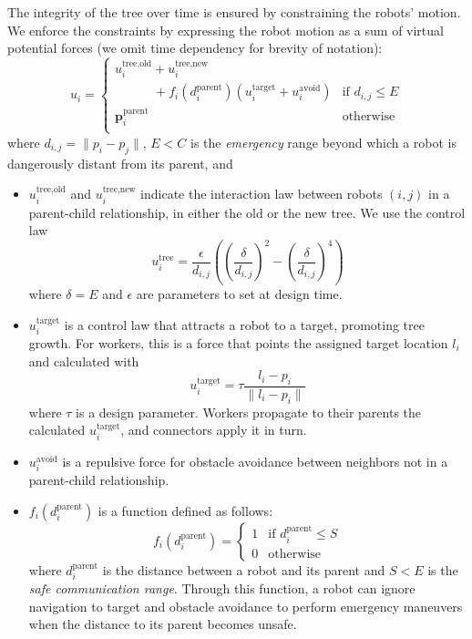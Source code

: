The integrity of the tree over time is ensured by constraining the
robots' motion. We enforce the constraints by expressing the robot
motion as a sum of virtual potential forces (we omit time dependency
for brevity of notation):
$$
u_i =
\begin{cases}
  u_i^{\text{tree,old}} + u_i^{\text{tree,new}} \\ \quad\quad\quad + f_i(d_i^{\text{parent}}) (u_i^{\text{target}} + u_i^{\text{avoid}}) & \text{if }d_{i,j} \le E\\
  \mathbf{p}_i^{\text{parent}} & \text{otherwise} \\
\end{cases}
$$
where $d_{i,j} = \parallel p_i - p_j \parallel$, $E < C$ is the
\emph{emergency} range beyond which a robot is dangerously distant
from its parent, and
\begin{itemize}
\item $u_i^{\text{tree,old}}$ and $u_i^{\text{tree,new}}$ indicate the
  interaction law between robots $(i,j)$ in a parent-child
  relationship, in either the old or the new tree. We use the control
  law
  $$
  u_i^{\text{tree}} =
  \frac{\epsilon}{d_{i,j}}
  \left(
    \left(
      \frac{\delta}{d_{i,j}}
    \right)^2
    -
    \left(
      \frac{\delta}{d_{i,j}}
    \right)^4
  \right)
  $$
  where $\delta = E$ and
  $\epsilon$ are parameters to set at design time.
\item $u_i^{\text{target}}$ is a control law that attracts a robot to a
  target, promoting tree growth. For workers, this is a force that
  points the assigned target location $l_i$ and calculated with
  $$
  u_i^{\text{target}} = \tau \frac{l_i - p_i}{\parallel l_i - p_i \parallel}
  $$
  where $\tau$ is a design parameter. Workers propagate to their
  parents the calculated $u_i^{\text{target}}$, and connectors apply it in turn.
\item $u_i^{\text{avoid}}$ is a repulsive force for obstacle avoidance
  between neighbors not in a parent-child relationship.
\item $f_i(d_i^{\text{parent}})$ is a function defined as follows:
  $$
  f_i(d_i^{\text{parent}}) =
  \begin{cases}
    1 & \text{if }d_i^{\text{parent}} \le S\\
    0 & \text{otherwise}
  \end{cases}
  $$
  where $d_i^{\text{parent}}$ is the distance between a robot and its
  parent and $S < E$ is the \emph{safe communication range}. Through
  this function, a robot can ignore navigation to target and obstacle
  avoidance to perform emergency maneuvers when the distance to its
  parent becomes unsafe.
\end{itemize}

